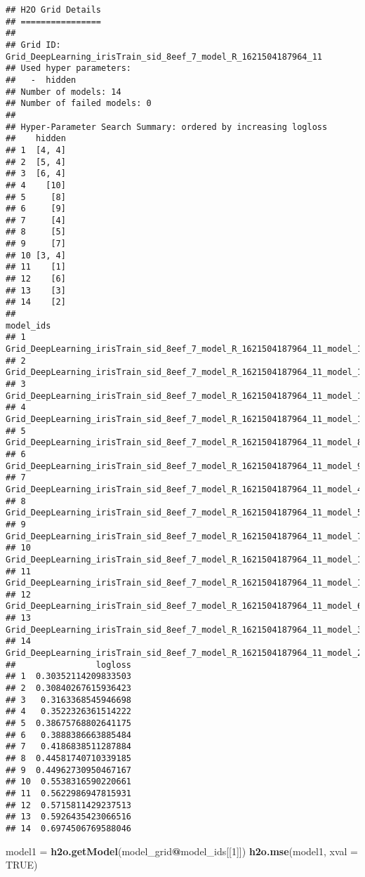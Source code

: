 \documentclass[
]{book}
\newenvironment{Shaded}{\begin{snugshade}}{\end{snugshade}}
\newcommand{\DataTypeTok}[1]{\textcolor[rgb]{0.13,0.29,0.53}{#1}}
\newcommand{\DecValTok}[1]{\textcolor[rgb]{0.00,0.00,0.81}{#1}}
\newcommand{\KeywordTok}[1]{\textcolor[rgb]{0.13,0.29,0.53}{\textbf{#1}}}
\newcommand{\NormalTok}[1]{#1}
\newcommand{\OperatorTok}[1]{\textcolor[rgb]{0.81,0.36,0.00}{\textbf{#1}}}
\newcommand{\OtherTok}[1]{\textcolor[rgb]{0.56,0.35,0.01}{#1}}
\newcommand{\StringTok}[1]{\textcolor[rgb]{0.31,0.60,0.02}{#1}}
\begin{document}
\begin{verbatim}
## H2O Grid Details
## ================
## 
## Grid ID: Grid_DeepLearning_irisTrain_sid_8eef_7_model_R_1621504187964_11 
## Used hyper parameters: 
##   -  hidden 
## Number of models: 14 
## Number of failed models: 0 
## 
## Hyper-Parameter Search Summary: ordered by increasing logloss
##    hidden
## 1  [4, 4]
## 2  [5, 4]
## 3  [6, 4]
## 4    [10]
## 5     [8]
## 6     [9]
## 7     [4]
## 8     [5]
## 9     [7]
## 10 [3, 4]
## 11    [1]
## 12    [6]
## 13    [3]
## 14    [2]
##                                                                   model_ids
## 1  Grid_DeepLearning_irisTrain_sid_8eef_7_model_R_1621504187964_11_model_12
## 2  Grid_DeepLearning_irisTrain_sid_8eef_7_model_R_1621504187964_11_model_13
## 3  Grid_DeepLearning_irisTrain_sid_8eef_7_model_R_1621504187964_11_model_14
## 4  Grid_DeepLearning_irisTrain_sid_8eef_7_model_R_1621504187964_11_model_10
## 5   Grid_DeepLearning_irisTrain_sid_8eef_7_model_R_1621504187964_11_model_8
## 6   Grid_DeepLearning_irisTrain_sid_8eef_7_model_R_1621504187964_11_model_9
## 7   Grid_DeepLearning_irisTrain_sid_8eef_7_model_R_1621504187964_11_model_4
## 8   Grid_DeepLearning_irisTrain_sid_8eef_7_model_R_1621504187964_11_model_5
## 9   Grid_DeepLearning_irisTrain_sid_8eef_7_model_R_1621504187964_11_model_7
## 10 Grid_DeepLearning_irisTrain_sid_8eef_7_model_R_1621504187964_11_model_11
## 11  Grid_DeepLearning_irisTrain_sid_8eef_7_model_R_1621504187964_11_model_1
## 12  Grid_DeepLearning_irisTrain_sid_8eef_7_model_R_1621504187964_11_model_6
## 13  Grid_DeepLearning_irisTrain_sid_8eef_7_model_R_1621504187964_11_model_3
## 14  Grid_DeepLearning_irisTrain_sid_8eef_7_model_R_1621504187964_11_model_2
##                logloss
## 1  0.30352114209833503
## 2  0.30840267615936423
## 3   0.3163368545946698
## 4   0.3522326361514222
## 5  0.38675768802641175
## 6   0.3888386663885484
## 7   0.4186838511287884
## 8  0.44581740710339185
## 9  0.44962730950467167
## 10  0.5538316590220661
## 11  0.5622986947815931
## 12  0.5715811429237513
## 13  0.5926435423066516
## 14  0.6974506769588046
\end{verbatim}

\begin{Shaded}
\begin{Highlighting}[]
\NormalTok{model1 =}\StringTok{ }\KeywordTok{h2o.getModel}\NormalTok{(model_grid}\OperatorTok{@}\NormalTok{model_ids[[}\DecValTok{1}\NormalTok{]])}
\KeywordTok{h2o.mse}\NormalTok{(model1, }\DataTypeTok{xval =} \OtherTok{TRUE}\NormalTok{)}
\end{Highlighting}
\end{Shaded}
\end{document}
